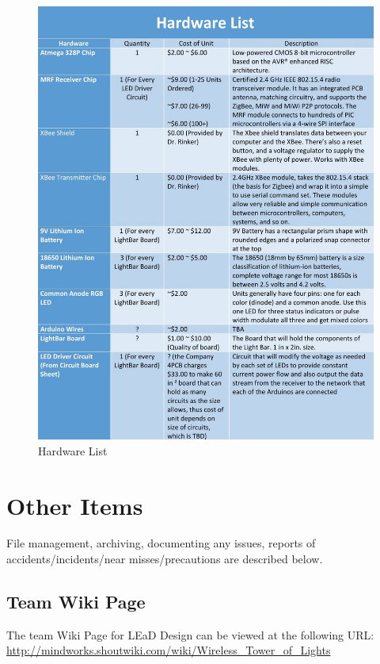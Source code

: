 \documentclass[12pt]{article}
\begin{document}
{{{{{{{{			\begin{figure}[ht!]
				\centering
				\includegraphics[width=170mm]{assets/HardwareList.jpg}
				\caption{Hardware List \label{overflow}}
			\end{figure}
			
			\newpage

\section{Other Items}
	File management, archiving, documenting any issues, reports of accidents/incidents/near misses/precautions are described below.
	
	\subsection{Team Wiki Page}
	The team Wiki Page for LEaD Design can be viewed at the following URL: \\
	\url{http://mindworks.shoutwiki.com/wiki/Wireless_Tower_of_Lights}
	
}}}}}}}}
\end{document}
